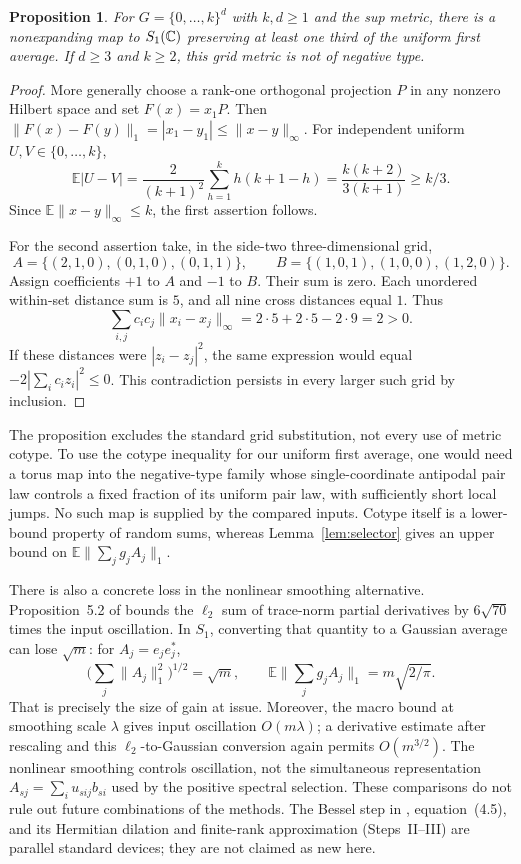 \documentclass[11pt]{article}
\newtheorem{proposition}[theorem]{Proposition}
\theoremstyle{remark}\newtheorem{remark}[theorem]{Remark}
\numberwithin{equation}{section}
\newcommand{\E}{\mathbb E}\newcommand{\Prob}{\mathbb P}
\newcommand{\norm}[1]{\lVert #1\rVert}
\begin{document}
\begin{proposition}\label{prop:grid}
For $G=\{0,\ldots,k\}^d$ with $k,d\ge1$ and the sup metric,
there is a nonexpanding map to $S_1(\mathbb C)$ preserving at least one third
of the uniform first average. If $d\ge3$ and $k\ge2$, this grid metric
is not of negative type.
\end{proposition}
\begin{proof}
More generally choose a rank-one orthogonal projection $P$ in any
nonzero Hilbert space and set $F(x)=x_1P$. Then
$\norm{F(x)-F(y)}_1=|x_1-y_1|\le\norm{x-y}_\infty$. For independent
uniform $U,V\in\{0,\ldots,k\}$,
\[
 \E|U-V|=\frac2{(k+1)^2}\sum_{h=1}^k h(k+1-h)
       =\frac{k(k+2)}{3(k+1)}\ge k/3.
\]
Since $\E\norm{x-y}_\infty\le k$, the first assertion follows.

For the second assertion take, in the side-two three-dimensional grid,
\[
 A=\{(2,1,0),(0,1,0),(0,1,1)\},\qquad
 B=\{(1,0,1),(1,0,0),(1,2,0)\}.
\]
Assign coefficients $+1$ to $A$ and $-1$ to $B$. Their sum is zero.
Each unordered within-set distance sum is $5$, and all nine cross
distances equal $1$. Thus
\[
 \sum_{i,j}c_ic_j\norm{x_i-x_j}_\infty=2\cdot5+2\cdot5-2\cdot9=2>0.
\]
If these distances were $|z_i-z_j|^2$, the same expression would equal
$-2|\sum_i c_i z_i|^2\le0$. This contradiction persists in every larger
such grid by inclusion.
\end{proof}
The proposition excludes the standard grid substitution, not every use
of metric cotype. To use the cotype inequality for our uniform first
average, one would need a torus map into the negative-type family whose
single-coordinate antipodal pair law controls a fixed fraction of its
uniform pair law, with sufficiently short local jumps. No such map is
supplied by the compared inputs. Cotype itself is a lower-bound property
of random sums, whereas Lemma~\ref{lem:selector} gives an upper bound on
$\E\norm{\sum_jg_jA_j}_1$.

There is also a concrete loss in the nonlinear smoothing alternative.
Proposition~5.2 of \cite{JLW} bounds the $\ell_2$ sum of trace-norm
partial derivatives by $6\sqrt{70}$ times the input oscillation. In
$S_1$, converting that quantity to a Gaussian average can lose
$\sqrt m$: for $A_j=e_je_j^*$,
\[
 \Big(\sum_j\norm{A_j}_1^2\Big)^{1/2}=\sqrt m,
 \qquad \E\norm{\sum_jg_jA_j}_1=m\sqrt{2/\pi}.
\]
That is precisely the size of gain at issue. Moreover, the macro bound
at smoothing scale $\lambda$ gives input oscillation $O(m\lambda)$;
a derivative estimate after rescaling and this $\ell_2$-to-Gaussian
conversion again permits $O(m^{3/2})$. The nonlinear smoothing controls
oscillation, not the simultaneous representation
$A_{sj}=\sum_i u_{sij}b_{si}$ used by the positive spectral selection.
These comparisons do not rule out future combinations of the methods.
The Bessel step in \cite{JLW}, equation~(4.5), and its Hermitian dilation
and finite-rank approximation (Steps~II--III) are parallel standard
devices; they are not claimed as new here.
\end{document}

